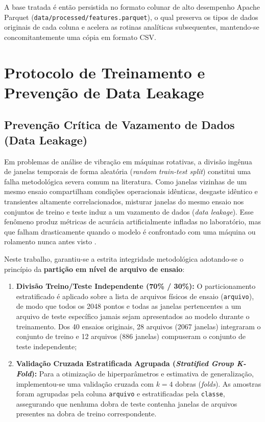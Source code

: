 A base tratada é então persistida no formato colunar de alto desempenho Apache Parquet (\texttt{data/processed/features.parquet}), o qual preserva os tipos de dados originais de cada coluna e acelera as rotinas analíticas subsequentes, mantendo-se concomitantemente uma cópia em formato CSV.

\section{Protocolo de Treinamento e Prevenção de Data Leakage}
\label{sec:protocolo_treinamento}

\subsection{Prevenção Crítica de Vazamento de Dados (Data Leakage)}
Em problemas de análise de vibração em máquinas rotativas, a divisão ingênua de janelas temporais de forma aleatória (\textit{random train-test split}) constitui uma falha metodológica severa comum na literatura. Como janelas vizinhas de um mesmo ensaio compartilham condições operacionais idênticas, desgaste idêntico e transientes altamente correlacionados, misturar janelas do mesmo ensaio nos conjuntos de treino e teste induz a um vazamento de dados (\textit{data leakage}). Esse fenômeno produz métricas de acurácia artificialmente infladas no laboratório, mas que falham drasticamente quando o modelo é confrontado com uma máquina ou rolamento nunca antes visto \cite{smith2015rolling}.

Neste trabalho, garantiu-se a estrita integridade metodológica adotando-se o princípio da \textbf{partição em nível de arquivo de ensaio}:
\begin{enumerate}
    \item \textbf{Divisão Treino/Teste Independente (70\% / 30\%):} O particionamento estratificado é aplicado sobre a lista de arquivos físicos de ensaio (\texttt{arquivo}), de modo que todos os \num{2048} pontos e todas as janelas pertencentes a um arquivo de teste específico jamais sejam apresentados ao modelo durante o treinamento. Dos 40 ensaios originais, 28 arquivos (\num{2067} janelas) integraram o conjunto de treino e 12 arquivos (\num{886} janelas) compuseram o conjunto de teste independente;
    \item \textbf{Validação Cruzada Estratificada Agrupada (\textit{Stratified Group K-Fold}):} Para a otimização de hiperparâmetros e estimativa de generalização, implementou-se uma validação cruzada com $k = 4$ dobras (\textit{folds}). As amostras foram agrupadas pela coluna \texttt{arquivo} e estratificadas pela \texttt{classe}, assegurando que nenhuma dobra de teste contenha janelas de arquivos presentes na dobra de treino correspondente.
\end{enumerate}


